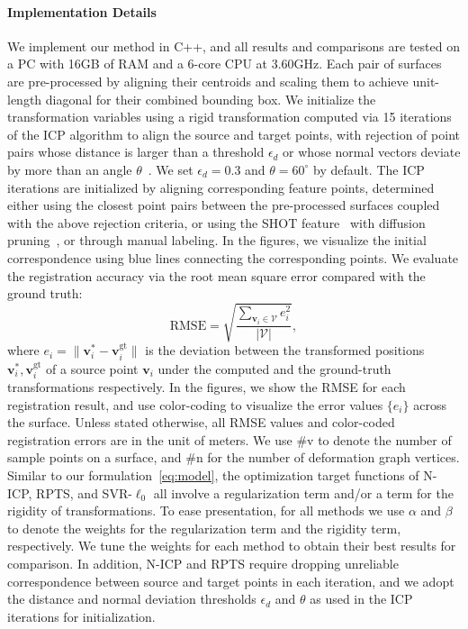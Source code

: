 \paragraph{Implementation Details}
We implement our method in C++, and all results and comparisons are tested on a PC with 16GB of RAM and a 6-core CPU at 3.60GHz.
Each pair of surfaces are pre-processed by aligning their centroids and scaling them to achieve unit-length diagonal for their combined bounding box.
We initialize the transformation variables using a rigid transformation computed via 15 iterations of the ICP algorithm to align the source and target points, with rejection of point pairs whose distance is larger than a threshold $\epsilon_d$ or whose normal vectors deviate by more than an angle $\theta$~\cite{Rusinkiewicz2001}. We set $\epsilon_d = 0.3$ and $\theta = 60^\circ$ by default. The ICP iterations are initialized by aligning corresponding feature points, determined either using the closest point pairs between the pre-processed surfaces coupled with the above rejection criteria, or using the SHOT feature~\cite{tombari2010unique} with diffusion pruning~\cite{tam2014diffusion}, or through manual labeling.
In the figures, we visualize the initial correspondence using blue lines connecting the corresponding points.
We evaluate the registration accuracy via the root mean square error compared with the ground truth:
\begin{equation}
\text{RMSE}=\sqrt{\frac{\sum_{\mathbf{v}_i \in{\mathcal{V}}}e_i^2}{|\mathcal{V}|}},
\end{equation}
where $e_i  = \|\mathbf{v}_i^{\ast} -\mathbf{v}_i^{\text{gt}}\|$
is the deviation between the transformed positions $\mathbf{v}_i^{\ast}, \mathbf{v}_i^{\text{gt}}$ of a source point $\mathbf{v}_i$ under the computed and the ground-truth transformations respectively. In the figures, we show the RMSE for each registration result, and use color-coding to visualize the error values $\{e_i\}$ across the surface. Unless stated otherwise, all RMSE values and color-coded registration errors are in the unit of meters. We use $\#$v to denote the number of sample points on a surface, and $\#$n for the number of deformation graph vertices.
Similar to our formulation~\eqref{eq:model}, the optimization target functions of N-ICP, RPTS, and SVR-$\ell_0$ all involve a regularization term and/or a term for the rigidity of transformations. To ease presentation, for all methods we use $\alpha$ and $\beta$ to denote the weights for the regularization term and the rigidity term, respectively. We tune the weights for each method to obtain their best results for comparison.
In addition, N-ICP and RPTS require dropping unreliable correspondence between source and target points in each iteration, and we adopt the distance and normal deviation thresholds $\epsilon_d$ and $\theta$ as used in the ICP iterations for initialization.



